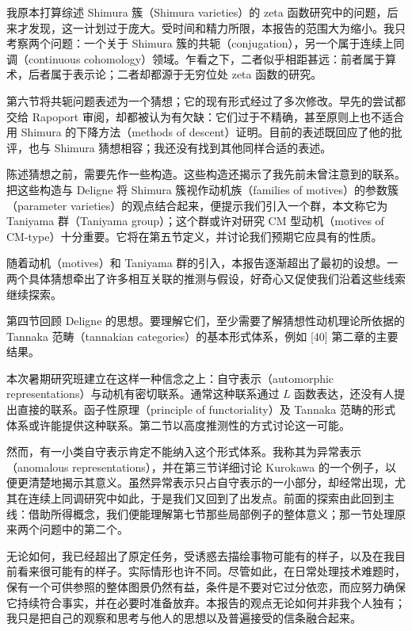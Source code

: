 
我原本打算综述 Shimura 簇（Shimura varieties）的 zeta 函数研究中的问题，后来才发现，这一计划过于庞大。受时间和精力所限，本报告的范围大为缩小。我只考察两个问题：一个关于 Shimura 簇的共轭（conjugation），另一个属于连续上同调（continuous cohomology）领域。乍看之下，二者似乎相距甚远：前者属于算术，后者属于表示论；二者却都源于无穷位处 zeta 函数的研究。

第六节将共轭问题表述为一个猜想；它的现有形式经过了多次修改。早先的尝试都交给 Rapoport 审阅，却都被认为有欠缺：它们过于不精确，甚至原则上也不适合用 Shimura 的下降方法（methods of descent）证明。目前的表述既回应了他的批评，也与 Shimura 猜想相容；我还没有找到其他同样合适的表述。

陈述猜想之前，需要先作一些构造。这些构造还揭示了我先前未曾注意到的联系。把这些构造与 Deligne 将 Shimura 簇视作动机族（families of motives）的参数簇（parameter varieties）的观点结合起来，便提示我们引入一个群，本文称它为 Taniyama 群（Taniyama group）；这个群或许对研究 CM 型动机（motives of CM-type）十分重要。它将在第五节定义，并讨论我们预期它应具有的性质。

随着动机（motives）和 Taniyama 群的引入，本报告逐渐超出了最初的设想。一两个具体猜想牵出了许多相互关联的推测与假设，好奇心又促使我们沿着这些线索继续探索。

第四节回顾 Deligne 的思想。要理解它们，至少需要了解猜想性动机理论所依据的 Tannaka 范畴（tannakian categories）的基本形式体系，例如 [40] 第二章的主要结果。

本次暑期研究班建立在这样一种信念之上：自守表示（automorphic representations）与动机有密切联系。通常这种联系通过 $L$ 函数表达，还没有人提出直接的联系。函子性原理（principle of functoriality）及 Tannaka 范畴的形式体系或许能提供这种联系。第二节以高度推测性的方式讨论这一可能。

然而，有一小类自守表示肯定不能纳入这个形式体系。我称其为异常表示（anomalous representations），并在第三节详细讨论 Kurokawa 的一个例子，以便更清楚地揭示其意义。虽然异常表示只占自守表示的一小部分，却经常出现，尤其在连续上同调研究中如此，于是我们又回到了出发点。前面的探索由此回到主线：借助所得概念，我们便能理解第七节那些局部例子的整体意义；那一节处理原来两个问题中的第二个。

无论如何，我已经超出了原定任务，受诱惑去描绘事物可能有的样子，以及在我目前看来很可能有的样子。实际情形也许不同。尽管如此，在日常处理技术难题时，保有一个可供参照的整体图景仍然有益，条件是不要对它过分依恋，而应努力确保它持续符合事实，并在必要时准备放弃。本报告的观点无论如何并非我个人独有；我只是把自己的观察和思考与他人的思想以及普遍接受的信条融合起来。

